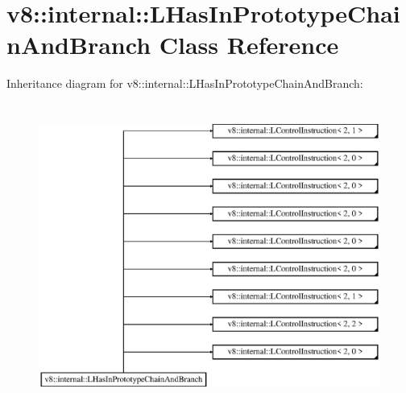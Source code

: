 \hypertarget{classv8_1_1internal_1_1_l_has_in_prototype_chain_and_branch}{}\section{v8\+:\+:internal\+:\+:L\+Has\+In\+Prototype\+Chain\+And\+Branch Class Reference}
\label{classv8_1_1internal_1_1_l_has_in_prototype_chain_and_branch}
Inheritance diagram for v8\+:\+:internal\+:\+:L\+Has\+In\+Prototype\+Chain\+And\+Branch\+:\begin{figure}[H]
\begin{center}
\leavevmode
\includegraphics[height=10.000000cm]{classv8_1_1internal_1_1_l_has_in_prototype_chain_and_branch}
\end{center}
\end{figure}
